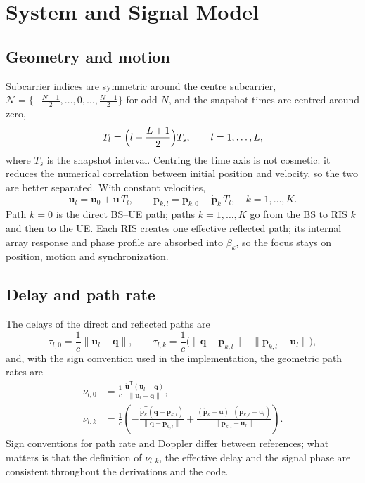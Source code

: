 \documentclass[11pt,a4paper]{article}
\newcommand{\vect}[1]{\bm{#1}}
\newcommand{\T}{\mathsf{T}}
\newcommand{\udot}{\dot{\vect{u}}}
\newcommand{\pdot}{\dot{\vect{p}}}
\begin{document}
\section{System and Signal Model}

\subsection{Geometry and motion}
Subcarrier indices are symmetric around the centre subcarrier, $\mathcal{N}=\{-\tfrac{N-1}{2},\dots,0,\dots,
\tfrac{N-1}{2}\}$ for odd $N$, and the snapshot times are centred around zero,
\begin{equation}
T_l=\Bigl(l-\frac{L+1}{2}\Bigr)T_s,\qquad l=1,\dots,L,
\end{equation}
where $T_s$ is the snapshot interval. Centring the time axis is not cosmetic: it reduces the numerical
correlation between initial position and velocity, so the two are better separated. With constant velocities,
\begin{equation}
\vect{u}_l=\vect{u}_0+\udot\,T_l,\qquad \vect{p}_{k,l}=\vect{p}_{k,0}+\pdot_k\,T_l,\quad k=1,\dots,K.
\end{equation}
Path $k=0$ is the direct BS--UE path; paths $k=1,\dots,K$ go from the BS to RIS $k$ and then to the UE. Each RIS
creates one effective reflected path; its internal array response and phase profile are absorbed into
$\beta_k$, so the focus stays on position, motion and synchronization.

\subsection{Delay and path rate}
The delays of the direct and reflected paths are
\begin{equation}
\tau_{l,0}=\frac{1}{c}\|\vect{u}_l-\vect{q}\|,\qquad
\tau_{l,k}=\frac{1}{c}\bigl(\|\vect{q}-\vect{p}_{k,l}\|+\|\vect{p}_{k,l}-\vect{u}_l\|\bigr),
\end{equation}
and, with the sign convention used in the implementation, the geometric path rates are
\begin{align}
\nu_{l,0}&=\frac{1}{c}\,\frac{\udot^{\T}(\vect{u}_l-\vect{q})}{\|\vect{u}_l-\vect{q}\|},\\
\nu_{l,k}&=\frac{1}{c}\left(-\frac{\pdot_k^{\T}(\vect{q}-\vect{p}_{k,l})}{\|\vect{q}-\vect{p}_{k,l}\|}
+\frac{(\pdot_k-\udot)^{\T}(\vect{p}_{k,l}-\vect{u}_l)}{\|\vect{p}_{k,l}-\vect{u}_l\|}\right).
\end{align}
Sign conventions for path rate and Doppler differ between references; what matters is that the definition of
$\nu_{l,k}$, the effective delay and the signal phase are consistent throughout the derivations and the code.
\end{document}
